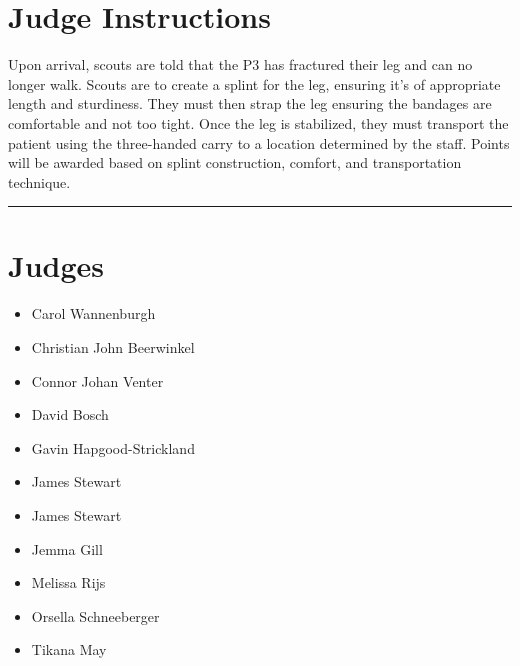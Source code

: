 \documentclass[10pt]{article}
\begin{document}
		\section*{Judge Instructions}
		Upon arrival, scouts are told that the P3 has fractured their leg and can no longer walk. Scouts are to create a splint for the leg, ensuring it's of appropriate length and sturdiness. They must then strap the leg ensuring the bandages are comfortable and not too tight. Once the leg is stabilized, they must transport the patient using the three-handed carry to a location determined by the staff. Points will be awarded based on splint construction, comfort, and transportation technique.


\vspace{0.5cm}
	\hrule
	\vspace{0.5cm}
		\section*{\faUsers \: Judges}

		

	\begin{multicols}{2}

		\begin{itemize}
									\item Carol Wannenburgh
									\item Christian John Beerwinkel
									\item Connor Johan Venter
									\item David Bosch
									\item Gavin Hapgood-Strickland
									\item James Stewart
						\end{itemize}

		\vfill\null
		\columnbreak

		\begin{itemize}
									\item James Stewart
									\item Jemma Gill
									\item Melissa Rijs
									\item Orsella Schneeberger
									\item Tikana May
						\end{itemize}

		\vfill\null

		\end{multicols}
\end{document}
